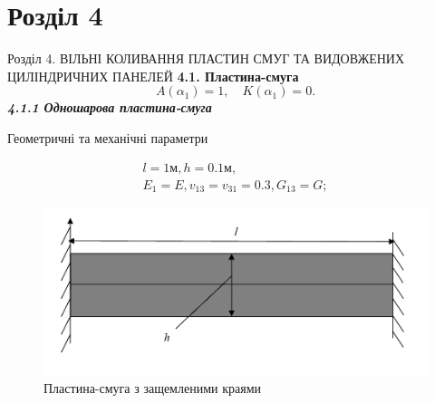 \documentclass[8pt]{beamer}
\numberwithin{figure}{section}
\numberwithin{equation}{section}
\numberwithin{table}{section}
\begin{document}
\section{Розділ 4}
\begin{frame}{Розділ 4. ВІЛЬНІ КОЛИВАННЯ ПЛАСТИН СМУГ ТА ВИДОВЖЕНИХ ЦИЛІНДРИЧНИХ ПАНЕЛЕЙ}
\textbf{4.1. Пластина-смуга}
\begin{equation}
A\left( \alpha_1 \right)=1, \quad K\left( \alpha_1 \right)=0.
\end{equation}
\textbf{\textit{4.1.1 Одношарова пластина-смуга}}
\vspace{1em}

Геометричні та механічні  параметри

\begin{gather*}
l=1\text{м}, h=0.1\text{м},\\
E_1=E, v_{13}=v_{31}=0.3, G_{13}=G;
\end{gather*}

\begin{figure}
	\includegraphics[scale=0.3]{pic/plate.png}
		\caption{Пластина-смуга з защемленими краями}
		\label{fig:plate}
\end{figure}



\end{frame}
\end{document}
